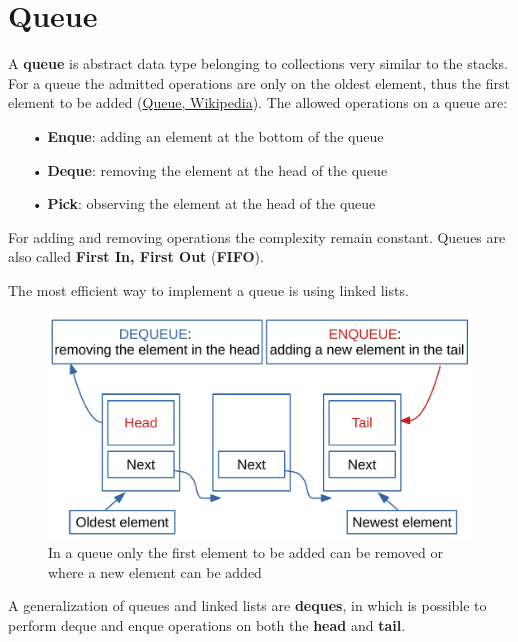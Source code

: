 \section{Queue}
A \textbf{queue} is abstract data type belonging to collections very similar to the stacks. For a queue the admitted operations are only on the oldest element, thus the first element to be added \cite{wikiqueue} (\href{https://en.wikipedia.org/wiki/Queue_(abstract_data_type)}{Queue, Wikipedia}). The allowed operations on a queue are:
\begin{itemize}
\item[•] \textbf{Enque}: adding an element at the bottom of the queue
\item[•] \textbf{Deque}: removing the element at the head of the queue
\item[•] \textbf{Pick}: observing the element at the head of the queue
\end{itemize}
For adding and removing operations the complexity remain constant. Queues are also called \textbf{First In, First Out} (\textbf{FIFO}). 

The most efficient way to implement a queue is using linked lists.

\begin{figure}[H]
	\begin{center}
		\includegraphics[scale=.6]{chapters/datastructures/images/queue_1.pdf}
		\caption[Allowed operations on queue elements]{In a queue only the first element to be added can be removed or where a new element can be added}
		\label{queue_1}
	\end{center}
\end{figure}

A generalization of queues and linked lists are \textbf{deques}, in which is possible to perform deque and enque operations on both the \textbf{head} and \textbf{tail}.

